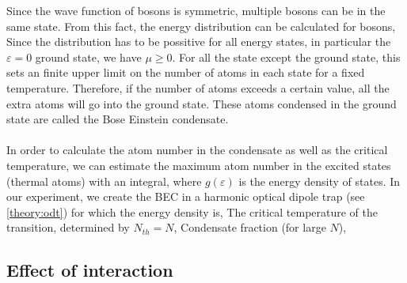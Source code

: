 Since the wave function of bosons is symmetric, multiple bosons can be in the same state. From this fact, the energy distribution can be calculated for bosons,
Since the distribution has to be possitive for all energy states, in particular the $\varepsilon=0$ ground state, we have $\mu\geqslant0$. For all the state except the ground state, this sets an finite upper limit on the number of atoms in each state for a fixed temperature. Therefore, if the number of atoms exceeds a certain value, all the extra atoms will go into the ground state. These atoms condensed in the ground state are called the Bose Einstein condensate.\\
\\
In order to calculate the atom number in the condensate as well as the critical temperature, we can estimate the maximum atom number in the excited states (thermal atoms) with an integral,
where $g(\varepsilon)$ is the energy density of states. In our experiment, we create the BEC in a harmonic optical dipole trap (see \ref{theory:odt}) for which the energy density is,
The critical temperature of the transition, determined by $N_{th}=N$,
Condensate fraction (for large $N$),


\subsection{Effect of interaction}

